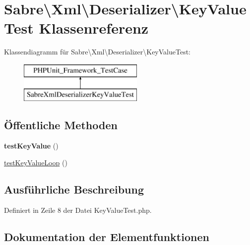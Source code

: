\hypertarget{class_sabre_1_1_xml_1_1_deserializer_1_1_key_value_test}{}\section{Sabre\textbackslash{}Xml\textbackslash{}Deserializer\textbackslash{}Key\+Value\+Test Klassenreferenz}
\label{class_sabre_1_1_xml_1_1_deserializer_1_1_key_value_test}
Klassendiagramm für Sabre\textbackslash{}Xml\textbackslash{}Deserializer\textbackslash{}Key\+Value\+Test\+:\begin{figure}[H]
\begin{center}
\leavevmode
\includegraphics[height=2.000000cm]{class_sabre_1_1_xml_1_1_deserializer_1_1_key_value_test}
\end{center}
\end{figure}
\subsection*{Öffentliche Methoden}
\begin{DoxyCompactItemize}
\item 
\mbox{\label{class_sabre_1_1_xml_1_1_deserializer_1_1_key_value_test_a081d2f240ef710bb1eab753d7c78f075}} 
{\bfseries test\+Key\+Value} ()
\item 
\mbox{\hyperlink{class_sabre_1_1_xml_1_1_deserializer_1_1_key_value_test_ad9e2476a2a402293f7b280c8a36e5972}{test\+Key\+Value\+Loop}} ()
\end{DoxyCompactItemize}


\subsection{Ausführliche Beschreibung}


Definiert in Zeile 8 der Datei Key\+Value\+Test.\+php.



\subsection{Dokumentation der Elementfunktionen}
\mbox{\label{class_sabre_1_1_xml_1_1_deserializer_1_1_key_value_test_ad9e2476a2a402293f7b280c8a36e5972}} 
